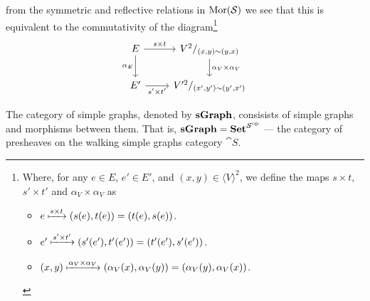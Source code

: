 \begin{definition}
\begin{itemize}
\[      \]
      from the symmetric and reflective relations in \(\operatorname{Mor}(\mathcal S)\) we see
      that this is equivalent to the commutativity of the diagram\footnote{
        Where, for any \(e \in E\), \(e' \in E'\), and \((x, y) \in \langle V
        \rangle^2\), we define the maps \(s \times t\), \(s' \times t'\) and
        \(\alpha_V \times \alpha_V\) as
        \begin{itemize}
          \setlength\itemsep{0.0em}
          \item \(e \xmapsto{s \times t} (s(e), t(e)) = (t(e), s(e))\).
          \item \(e' \xmapsto{s' \times t'} (s'(e'), t'(e')) = (t'(e'),
            s'(e'))\).
          \item \((x, y) \xmapsto{\alpha_V \times \alpha_V} (\alpha_V(x),
            \alpha_V(y)) = (\alpha_V(y), \alpha_V(x))\).
        \end{itemize}
      }
      \[
        \begin{tikzcd}
          E \ar[r, "s \times t"]
          \ar[d, swap, "\alpha_E"]
          &V^2/_{(x, y) \sim (y, x)}
          \ar[d, "\alpha_V \times \alpha_V"]
          \\
          E' \ar[r, swap, "s' \times t'"] &V'^2/_{(x', y') \sim (y', x')}
        \end{tikzcd}
      \]
  \end{itemize}
\end{definition}

\begin{definition}
  The category of simple graphs, denoted by \({\textbf{sGraph}}\), consisists of
  simple graphs and morphisms between them. That is, \({\textbf{sGraph}} = {\textbf{Set}}^{\mathcal
  S^{\mathrm{op}}}\) --- the category of presheaves on the walking simple graphs category
  \(\cat S\).
\end{definition}
